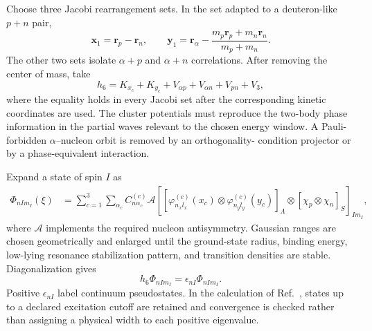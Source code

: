 Choose three Jacobi rearrangement sets.  In the set adapted to a deuteron-like
$p+n$ pair,
\begin{equation}
  \bm x_1=\bm r_p-\bm r_n,
  \qquad
  \bm y_1=\bm r_\alpha-
  \frac{m_p\bm r_p+m_n\bm r_n}{m_p+m_n}.
  \label{eq:li6-jacobi-dalpha}
\end{equation}
The other two sets isolate $\alpha+p$ and $\alpha+n$ correlations.  After
removing the center of mass, take
\begin{equation}
  h_6=K_{x_c}+K_{y_c}
  +V_{\alpha p}+V_{\alpha n}+V_{pn}+V_3,
  \label{eq:li6-internal-H}
\end{equation}
where the equality holds in every Jacobi set after the corresponding kinetic
coordinates are used.  The cluster potentials must reproduce the two-body
phase information in the partial waves relevant to the chosen energy window.
A Pauli-forbidden $\alpha$--nucleon orbit is removed by an orthogonality-
condition projector or by a phase-equivalent interaction.

Expand a state of spin $I$ as
\begin{align}
  \Phi_{nIm_I}(\xi)
  &=\sum_{c=1}^{3}\sum_{\alpha_c}
  C_{n\alpha_c}^{(c)}
  \mathcal A
  \left[
    [\varphi_{n_xl_x}^{(c)}(x_c)
     \otimes\varphi_{n_yl_y}^{(c)}(y_c)]_{\Lambda}
     \otimes[\chi_p\otimes\chi_n]_S
  \right]_{Im_I},
  \label{eq:li6-gem-expansion}
\end{align}
where $\mathcal A$ implements the required nucleon antisymmetry.  Gaussian
ranges are chosen geometrically and enlarged until the ground-state radius,
binding energy, low-lying resonance stabilization pattern, and transition
densities are stable.  Diagonalization gives
\begin{equation}
  h_6\Phi_{nIm_I}=\epsilon_{nI}\Phi_{nIm_I}.
  \label{eq:li6-pseudostates}
\end{equation}
Positive $\epsilon_{nI}$ label continuum pseudostates.  In the calculation of
Ref.~\cite{Ogata:2026LiCDCC}, states up to a declared excitation cutoff are
retained and convergence is checked rather than assigning a physical width to
each positive eigenvalue.

